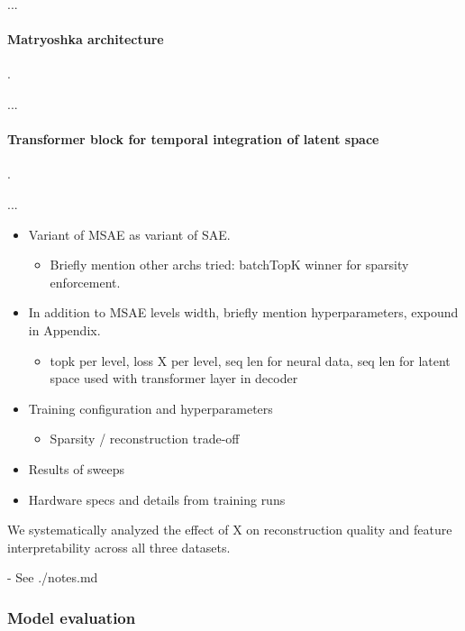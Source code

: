 ...

\paragraph{Matryoshka architecture}.

...

\paragraph{Transformer block for temporal integration of latent space}.

...

\begin{itemize}
    
    \item Variant of MSAE as variant of SAE.
    \begin{itemize}
        \item Briefly mention other archs tried: batchTopK winner for sparsity enforcement.
    \end{itemize}
    
    \item In addition to MSAE levels width, briefly mention hyperparameters, expound in Appendix.
    \begin{itemize}
        \item topk per level, loss X per level, seq len for neural data, seq len for latent space used with transformer layer in decoder
    \end{itemize}

\end{itemize}

\begin{itemize}
    \item Training configuration and hyperparameters
    \begin{itemize}
        \item Sparsity / reconstruction trade-off
    \end{itemize}
    \item Results of sweeps
    \item Hardware specs and details from training runs
\end{itemize}

We systematically analyzed the effect of X on reconstruction quality and feature interpretability across all three datasets.

- See ./notes.md

\subsubsection{Model evaluation}
\label{subsubsection:model_evaluation_details}

